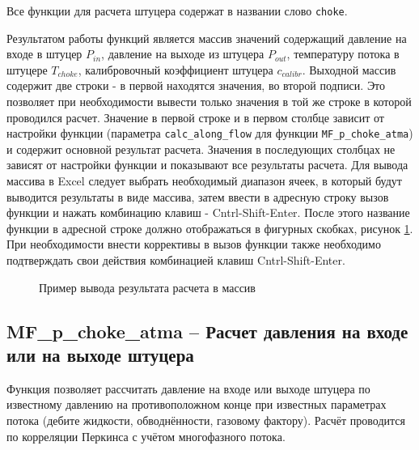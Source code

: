 Все функции для расчета штуцера содержат в названии слово \texttt{choke}. 
 
Результатом работы функций является массив значений содержащий давление на входе в штуцер $P_{in}$, давление на выходе из штуцера $P_{out}$, температуру потока в штуцере $T_{choke}$, калибровочный коэффициент штуцера $c_{calibr}$.  Выходной массив содержит две строки - в первой находятся значения, во второй подписи. Это позволяет при необходимости вывести только значения в той же строке в которой проводился расчет. Значение в первой строке и в первом столбце зависит от настройки функции (параметра \texttt{calc_along_flow} для функции \texttt{MF_p_choke_atma}) и содержит основной результат расчета. Значения в последующих столбцах не зависят от настройки функции и показывают все результаты расчета.
Для вывода массива в Excel следует выбрать необходимый диапазон ячеек, в который будут выводится результаты в виде массива, затем ввести в адресную строку вызов функции и нажать комбинацию клавиш - Cntrl-Shift-Enter. После этого название функции в адресной строке должно отображаться в фигурных скобках, рисунок \ref{ris:choke_array_out}. При необходимости внести коррективы в вызов функции также необходимо подтверждать свои действия комбинацией клавиш Cntrl-Shift-Enter.


\begin{figure}[ht]
	\caption{Пример вывода результата расчета в массив}
	\label{ris:choke_array_out}
\end{figure}


\subsection{MF\_p\_choke\_atma – Расчет давления на входе или на выходе штуцера}
Функция позволяет рассчитать давление на входе или выходе штуцера по известному давлению на противоположном конце при известных параметрах потока (дебите жидкости, обводнённости, газовому фактору). Расчёт проводится по корреляции Перкинса \cite{Perkins_1993} с учётом многофазного потока. 
 






